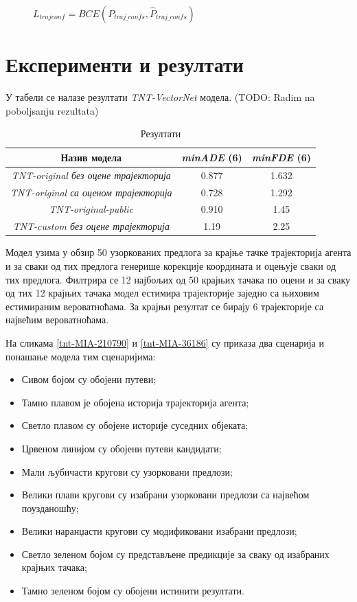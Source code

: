 \documentclass[11pt,oneside]{memoir}
\begin{document}
\begin{figure}[H]
  \centering
  $L_{trajconf} = BCE(P_{traj\_confs}, \hat{P}_{traj\_confs})$
\end{figure}

\section{Експерименти и резултати}

У табели  се налазе резултати \textit{TNT-VectorNet} модела. (TODO: Radim na poboljsanju rezultata)

\begin{table}[H]
  \begin{tabular}{c|c|c}
    Назив модела & \textit{minADE} (6) & \textit{minFDE} (6) \\
    \hline
    \textit{TNT-original без оцене трајекторија} & 0.877 & 1.632 \\
    \textit{TNT-original са оценом трајекторија} & 0.728 & 1.292 \\
    \textit{TNT-original-public} & 0.910 & 1.45 \\
    \textit{TNT-custom без оцене трајекторија}  & 1.19 & 2.25
  \end{tabular}
  \caption{Резултати}
  \label{vectornet-results}
\end{table}

Модел узима у обзир 50 узоркованих предлога за крајње тачке трајекторија агента и за сваки од тих предлога генерише корекције координата
и оцењује сваки од тих предлога. Филтрира се 12 најбољих од 50 крајњих тачака по оцени и за сваку од тих 12 крајњих тачака
модел естимира трајекторије заједно са њиховим естимираним вероватноћама. За крајњи резултат се бирају 6 трајекторије са највећим 
вероватноћама.   

На сликама \ref{tnt-MIA-210790} и \ref{tnt-MIA-36186} су приказа два сценарија и понашање модела тим сценаријима:
\begin{itemize}
  \item Сивом бојом су обојени путеви; 
  \item Тамно плавом је обојена историја трајекторија агента;
  \item Светло плавом су обојене историје суседних објеката;
  \item Црвеном линијом су обојени путеви кандидати;
  \item Мали љубичасти кругови су узорковани предлози;
  \item Велики плави кругови су изабрани узорковани предлози са највећом поузданошћу;
  \item Велики наранџасти кругови су модификовани изабрани предлози; 
  \item Светло зеленом бојом су представљене предикције за сваку од изабраних крајњих тачака;
  \item Тамно зеленом бојом су обојени истинити резултати. 
\end{itemize}
\end{document}
